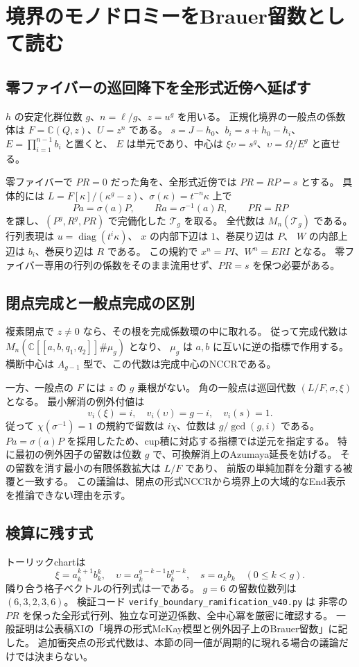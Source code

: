 \section{境界のモノドロミーをBrauer留数として読む}
\label{sec:notes-boundary-ramification-v40}

\subsection{零ファイバーの巡回降下を全形式近傍へ延ばす}
$h$ の安定化群位数 $g$、$n=\ell/g$、$z=u^g$ を用いる。
正規化境界の一般点の係数体は $F=\mathbb C(Q,z)$、$U=z^n$ である。
$s=J-h_0$、$b_i=s+h_0-h_i$、$E=\prod_{i=1}^{n-1}b_i$ と置くと、
$E$ は単元であり、中心は $\xi\upsilon=s^g$、$\upsilon=\Omega/E^g$ と直せる。

零ファイバーで $PR=0$ だった角を、全形式近傍では $PR=RP=s$ とする。
具体的には $L=F[\kappa]/(\kappa^g-z)$、$\sigma(\kappa)=t^{-n}\kappa$ 上で
\[
 Pa=\sigma(a)P,\qquad Ra=\sigma^{-1}(a)R,\qquad PR=RP
\]
を課し、$(P^g,R^g,PR)$ で完備化した $\mathcal T_g$ を取る。
全代数は $M_n(\mathcal T_g)$ である。
行列表現は $u=\operatorname{diag}(t^i\kappa)$、
$x$ の内部下辺は $1$、巻戻り辺は $P$、
$W$ の内部上辺は $b_i$、巻戻り辺は $R$ である。
この規約で $x^n=P I$、$W^n=E R I$ となる。
零ファイバー専用の行列の係数をそのまま流用せず、$PR=s$ を保つ必要がある。

\subsection{閉点完成と一般点完成の区別}
複素閉点で $z\ne0$ なら、その根を完成係数環の中に取れる。
従って完成代数は
$M_n(\mathbb C[[a,b,q_1,q_2]]\#\mu_g)$ となり、
$\mu_g$ は $a,b$ に互いに逆の指標で作用する。
横断中心は $A_{g-1}$ 型で、この代数は完成中心のNCCRである。

一方、一般点の $F$ には $z$ の $g$ 乗根がない。
角の一般点は巡回代数 $(L/F,\sigma,\xi)$ となる。
最小解消の例外付値は
\[
 v_i(\xi)=i,\quad v_i(\upsilon)=g-i,\quad v_i(s)=1.
\]
従って $\chi(\sigma^{-1})=1$ の規約で留数は $i\chi$、位数は $g/\gcd(g,i)$ である。
$Pa=\sigma(a)P$ を採用したため、cup積に対応する指標では逆元を指定する。
特に最初の例外因子の留数は位数 $g$ で、可換解消上のAzumaya延長を妨げる。
その留数を消す最小の有限係数拡大は $L/F$ であり、
前版の単純加群を分離する被覆と一致する。
この議論は、閉点の形式NCCRから境界上の大域的なEnd表示を推論できない理由を示す。

\subsection{検算に残す式}
トーリックchartは
\[
 \xi=a_k^{k+1}b_k^k,\quad
 \upsilon=a_k^{g-k-1}b_k^{g-k},\quad s=a_kb_k
 \quad(0\le k<g).
\]
隣り合う格子ベクトルの行列式は一である。
$g=6$ の留数位数列は $(6,3,2,3,6)$。
検証コード \texttt{verify\_boundary\_ramification\_v40.py} は
非零の $PR$ を保った全形式行列、独立な可逆辺係数、全中心冪を厳密に確認する。
一般証明は公表稿XIの「境界の形式McKay模型と例外因子上のBrauer留数」に記した。
追加衝突点の形式代数は、本節の同一値が周期的に現れる場合の議論だけでは決まらない。
